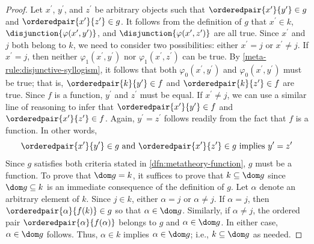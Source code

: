 \begin{proof}
    \vspace{0.3cm}
    \noindent
    Let \( x^{\prime} \), \( y^{\prime} \), and \( z^{\prime} \) be arbitrary objects
    such that \( \orderedpair{x^{\prime}}{y^{\prime}} \in g \) and \( \orderedpair{x^{\prime}}{z^{\prime}} \in g \).
    It follows from the definition of \( g \) that \( x^{\prime} \in k \),
    \( \disjunction{\varphi(x^{\prime}, y^{\prime})} \), and \( \disjunction{\varphi(x^{\prime}, z^{\prime})} \) are all true.
    Since \( x^{\prime} \) and \( j \) both belong to \( k \), we need to consider two possibilities: either \( x^{\prime} = j \) or \( x^{\prime} \neq j \).
    If \( x^{\prime} = j \), then neither \( \varphi_{1}(x^{\prime}, y^{\prime}) \) nor \( \varphi_{1}(x^{\prime}, z^{\prime}) \) can be true.
    By \cref{meta-rule:disjunctive-syllogism}, it follows that both \( \varphi_{0}(x^{\prime}, y^{\prime}) \) and \( \varphi_{0}(x^{\prime}, y^{\prime}) \)
    must be true; that is, \( \orderedpair{k}{y^{\prime}} \in f \) and \( \orderedpair{k}{z^{\prime}} \in f \) are true.
    Since \( f \) is a function, \( y^{\prime} \) and \( z^{\prime} \) must be equal.
    If \( x^{\prime} \neq j \), we can use a similar line of reasoning to infer that \( \orderedpair{x^{\prime}}{y^{\prime}} \in f \) and
    \( \orderedpair{x^{\prime}}{z^{\prime}} \in f \). Again, \( y^{\prime} = z^{\prime} \) follows readily from the fact that \( f \) is a function.
    In other words,
    \begin{equation*}
        \orderedpair{x^{\prime}}{y^{\prime}} \in g \ \text{and} \ \orderedpair{x^{\prime}}{z^{\prime}} \in g \ \text{implies} \ y^{\prime} = z^{\prime}
    \end{equation*}
    Since \( g \) satisfies both criteria stated in \cref{dfn:metatheory-function}, \( g \) must be a function.
    To prove that \( \dom g = k \), it suffices to prove that \( k \subseteq \dom g \) since \( \dom g \subseteq k \) is an immediate consequence of
    the definition of \( g \).
    Let \( \alpha \) denote an arbitrary element of \( k \).
    Since \( j \in k \), either \( \alpha = j \) or \( \alpha \neq j \).
    If \( \alpha = j \), then \( \orderedpair{\alpha}{f(k)} \in g \) so that \( \alpha \in \dom g \).
    Similarly, if \( \alpha \neq j \), the ordered pair \( \orderedpair{\alpha}{f(\alpha)} \) belongs to \( g \) and \( \alpha \in \dom g \).
    In either case, \( \alpha \in \dom g \) follows. Thus, \( \alpha \in k \) implies \( \alpha \in \dom g \); i.e., \( k \subseteq \dom g \) as needed.


\end{proof}
